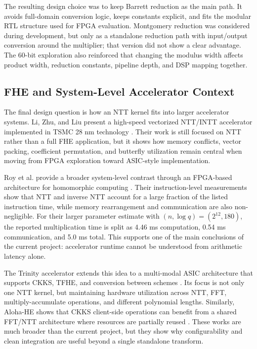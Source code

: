 \documentclass[a4paper, 12pt, titlepage]{article}
\begin{document}
The resulting design choice was to keep Barrett reduction as the main path. It avoids
full-domain conversion logic, keeps constants explicit, and fits the modular RTL
structure used for FPGA evaluation. Montgomery reduction was considered during
development, but only as a standalone reduction path with input/output
conversion around the multiplier; that version did not show a clear advantage.
The 60-bit exploration also reinforced that changing the modulus width affects
product width, reduction constants, pipeline depth, and DSP mapping together.

\subsection{FHE and System-Level Accelerator Context}

The final design question is how an NTT kernel fits into larger accelerator
systems. Li, Zhu, and Liu present a high-speed vectorized NTT/INTT accelerator
implemented in TSMC 28 nm technology \cite{li-high-speed-ntt}. Their work is
still focused on NTT rather than a full FHE application, but it shows how memory
conflicts, vector packing, coefficient permutation, and butterfly utilization
remain central when moving from FPGA exploration toward ASIC-style
implementation.

Roy et al. provide a broader system-level contrast through an FPGA-based
architecture for homomorphic computing \cite{fpga-fhe}. Their instruction-level
measurements show that NTT and inverse NTT account for a large fraction of the
listed instruction time, while memory rearrangement and communication are also
non-negligible. For their larger parameter estimate with
\((n,\log q)=(2^{12},180)\), the reported multiplication time is split as
4.46 ms computation, 0.54 ms communication, and 5.0 ms total. This supports one
of the main conclusions of the current project: accelerator runtime cannot be
understood from arithmetic latency alone.

The Trinity accelerator extends this idea to a multi-modal ASIC architecture
that supports CKKS, TFHE, and conversion between schemes \cite{trinity}. Its
focus is not only one NTT kernel, but maintaining hardware utilization across
NTT, FFT, multiply-accumulate operations, and different polynomial lengths.
Similarly, Aloha-HE shows that CKKS client-side operations can benefit from a
shared FFT/NTT architecture where resources are partially reused
\cite{aloha-he}. These works are much broader than the current project, but
they show why configurability and clean integration are useful beyond a single
standalone transform.
\end{document}
